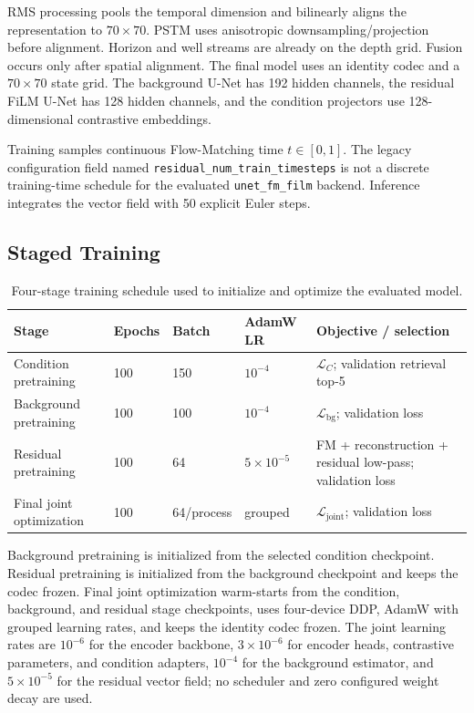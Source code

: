 \documentclass[11pt]{article}
\begin{document}
RMS processing pools the temporal dimension and bilinearly aligns the representation to $70\times70$. PSTM uses anisotropic downsampling/projection before alignment. Horizon and well streams are already on the depth grid. Fusion occurs only after spatial alignment. The final model uses an identity codec and a $70\times70$ state grid. The background U-Net has 192 hidden channels, the residual FiLM U-Net has 128 hidden channels, and the condition projectors use 128-dimensional contrastive embeddings.

Training samples continuous Flow-Matching time $t\in[0,1]$. The legacy configuration field named \texttt{residual\_num\_train\_timesteps} is not a discrete training-time schedule for the evaluated \texttt{unet\_fm\_film} backend. Inference integrates the vector field with 50 explicit Euler steps.

\subsection{Staged Training}

\begin{table}[t]
\centering
\small
\caption{Four-stage training schedule used to initialize and optimize the evaluated model.}
\begin{tabular}{p{}p{}p{}p{}p{}}
\toprule
Stage & Epochs & Batch & AdamW LR & Objective / selection \\
\midrule
Condition pretraining & 100 & 150 & $10^{-4}$ & $\mathcal L_C$; validation retrieval top-5 \\
Background pretraining & 100 & 100 & $10^{-4}$ & $\mathcal L_{\mathrm{bg}}$; validation loss \\
Residual pretraining & 100 & 64 & $5\times10^{-5}$ & FM + reconstruction + residual low-pass; validation loss \\
Final joint optimization & 100 & 64/process & grouped & $\mathcal L_{\mathrm{joint}}$; validation loss \\
\bottomrule
\end{tabular}
\end{table}

Background pretraining is initialized from the selected condition checkpoint. Residual pretraining is initialized from the background checkpoint and keeps the codec frozen. Final joint optimization warm-starts from the condition, background, and residual stage checkpoints, uses four-device DDP, AdamW with grouped learning rates, and keeps the identity codec frozen. The joint learning rates are $10^{-6}$ for the encoder backbone, $3\times10^{-6}$ for encoder heads, contrastive parameters, and condition adapters, $10^{-4}$ for the background estimator, and $5\times10^{-5}$ for the residual vector field; no scheduler and zero configured weight decay are used.
\end{document}
